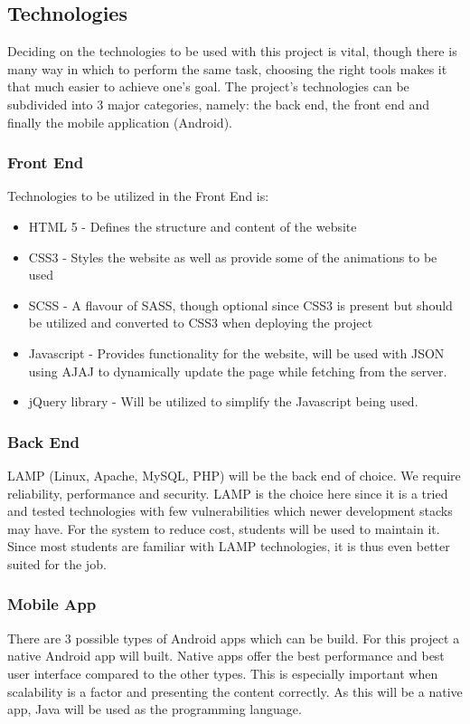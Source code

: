 \documentclass[a4paper,12pt]{report}
\begin{document}
\subsection{Technologies}
Deciding on the technologies to be used with this project is vital, though there is many way in which to perform the same task, choosing the right tools makes it that much easier to achieve one's goal. The project's technologies can be subdivided into 3 major categories, namely: the back end, the front end and finally the mobile application (Android).

\subsubsection{Front End}
Technologies to be utilized in the Front End is:
\begin{itemize}
\item HTML 5 - Defines the structure and content of the website
\item CSS3 - Styles the website as well as provide some of the animations to be used
\item SCSS - A flavour of SASS, though optional since CSS3 is present but should be utilized and converted to CSS3 when deploying the project
\item Javascript - Provides functionality for the website, will be used with JSON using AJAJ to dynamically update the page while fetching from the server. 
\item jQuery library - Will be utilized to simplify the Javascript being used. 
\end{itemize}

\subsubsection{Back End}
LAMP (Linux, Apache, MySQL, PHP) will be the back end of choice. We require reliability, performance and security. LAMP is the choice here since it is a tried and tested technologies with few vulnerabilities which newer development stacks may have. For the system to reduce cost, students will be used to maintain it. Since most students are familiar with LAMP technologies, it is thus even better suited for the job.

\subsubsection{Mobile App}
There are 3 possible types of Android apps which can be build. For this project a native Android app will built. Native apps offer the best performance and best user interface compared to the other types. This is especially important when scalability is a factor and presenting the content correctly. As this will be a native app, Java will be used as the programming language.
\end{document}
